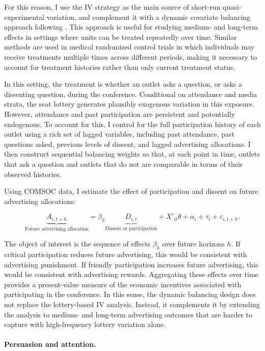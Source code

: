 For this reason, I use the IV strategy as the main source of short-run quasi-experimental variation, and complement it with a dynamic covariate balancing approach following \citet{VivianoDynamic}. This approach is useful for studying medium- and long-term effects in settings where units can be treated repeatedly over time. Similar methods are used in medical randomized control trials in which individuals may receive treatments multiple times across different periods, making it necessary to account for treatment histories rather than only current treatment status.

In this setting, the treatment is whether an outlet asks a question, or asks a dissenting question, during the conference. Conditional on attendance and media strata, the seat lottery generates plausibly exogenous variation in this exposure. However, attendance and past participation are persistent and potentially endogenous. To account for this, I control for the full participation history of each outlet using a rich set of lagged variables, including past attendance, past questions asked, previous levels of dissent, and lagged advertising allocations. I then construct sequential balancing weights so that, at each point in time, outlets that ask a question and outlets that do not are comparable in terms of their observed histories.

Using COMSOC data, I estimate the effect of participation and dissent on future advertising allocations:

\[
\underbrace{A_{i,t+h}}_{\text{Future advertising allocation}}
=
\beta_h
\underbrace{D_{i,t}}_{\text{Dissent or participation}}
+
X'_{it}\theta
+
\alpha_i
+
\tau_t
+
\varepsilon_{i,t+h}.
\]

The object of interest is the sequence of effects \(\beta_h\) over future horizons \(h\). If critical participation reduces future advertising, this would be consistent with advertising punishment. If friendly participation increases future advertising, this would be consistent with advertising rewards. Aggregating these effects over time provides a present-value measure of the economic incentives associated with participating in the conference. In this sense, the dynamic balancing design does not replace the lottery-based IV analysis. Instead, it complements it by extending the analysis to medium- and long-term advertising outcomes that are harder to capture with high-frequency lottery variation alone.

\paragraph{Persuasion and attention.}

